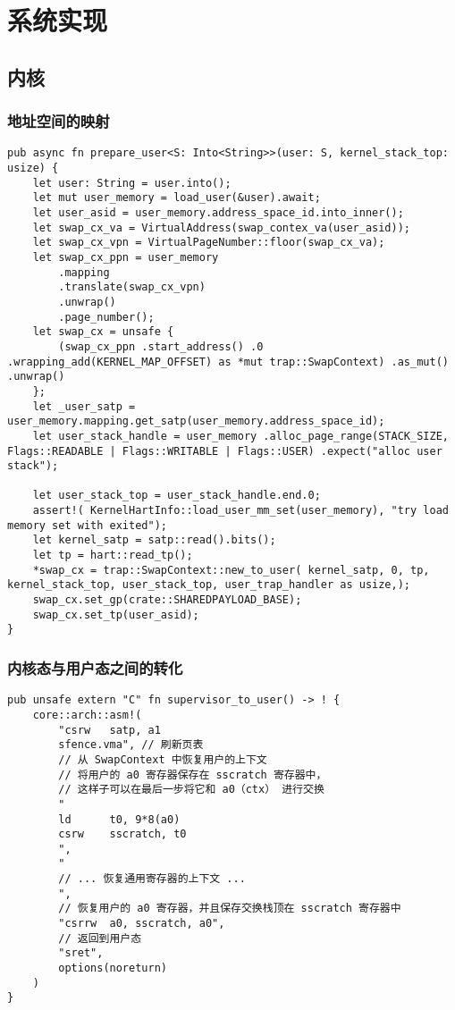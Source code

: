 \chapter{系统实现}
\label{chap:SystemImplement}

\section{内核}



\subsection{地址空间的映射}

\begin{lstlisting}[caption=用户态对地址空间的映射]
pub async fn prepare_user<S: Into<String>>(user: S, kernel_stack_top: usize) {
    let user: String = user.into();
    let mut user_memory = load_user(&user).await;
    let user_asid = user_memory.address_space_id.into_inner();
    let swap_cx_va = VirtualAddress(swap_contex_va(user_asid));
    let swap_cx_vpn = VirtualPageNumber::floor(swap_cx_va);
    let swap_cx_ppn = user_memory
        .mapping
        .translate(swap_cx_vpn)
        .unwrap()
        .page_number();
    let swap_cx = unsafe {
        (swap_cx_ppn .start_address() .0 .wrapping_add(KERNEL_MAP_OFFSET) as *mut trap::SwapContext) .as_mut() .unwrap()
    };
    let _user_satp = user_memory.mapping.get_satp(user_memory.address_space_id);
    let user_stack_handle = user_memory .alloc_page_range(STACK_SIZE, Flags::READABLE | Flags::WRITABLE | Flags::USER) .expect("alloc user stack");

    let user_stack_top = user_stack_handle.end.0;
    assert!( KernelHartInfo::load_user_mm_set(user_memory), "try load memory set with exited");
    let kernel_satp = satp::read().bits();
    let tp = hart::read_tp();
    *swap_cx = trap::SwapContext::new_to_user( kernel_satp, 0, tp, kernel_stack_top, user_stack_top, user_trap_handler as usize,);
    swap_cx.set_gp(crate::SHAREDPAYLOAD_BASE);
    swap_cx.set_tp(user_asid);
}
\end{lstlisting}


\subsection{内核态与用户态之间的转化}

\begin{lstlisting}[caption=由内核态进入用户态]
pub unsafe extern "C" fn supervisor_to_user() -> ! {
    core::arch::asm!(
        "csrw   satp, a1
        sfence.vma", // 刷新页表
        // 从 SwapContext 中恢复用户的上下文
        // 将用户的 a0 寄存器保存在 sscratch 寄存器中，
        // 这样子可以在最后一步将它和 a0（ctx） 进行交换
        "
        ld      t0, 9*8(a0)
        csrw    sscratch, t0
        ",
        "
        // ... 恢复通用寄存器的上下文 ...
        ",
        // 恢复用户的 a0 寄存器，并且保存交换栈顶在 sscratch 寄存器中
        "csrrw  a0, sscratch, a0",
        // 返回到用户态
        "sret",
        options(noreturn)
    )
}

\end{lstlisting}


